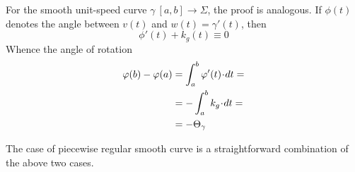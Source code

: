 For the smooth unit-speed curve $\gamma\:[a,b]\to\Sigma$, the proof is analogous.
If $\phi(t)$ denotes the angle between $v(t)$ and $w(t)=\gamma'(t)$, then 
\[\phi'(t)+k_g(t)\equiv0\]
Whence the angle of rotation 
\begin{align*}
\phi(b)-\phi(a)&=\int_a^b \phi'(t)\cdot dt=
\\
&=-\int_a^b k_g\cdot dt=
\\
&=-\tgc\gamma
\end{align*}

The case of piecewise regular smooth curve is a straightforward combination of the above two cases. 
\qeds
